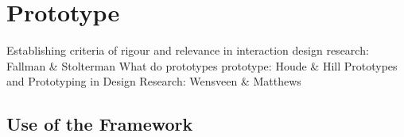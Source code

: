 \section{Prototype}

Establishing criteria of rigour and relevance in interaction design research: Fallman \& Stolterman
What do prototypes prototype: Houde \& Hill
Prototypes and Prototyping in Design Research: Wensveen \& Matthews

\subsection{Use of the Framework}
